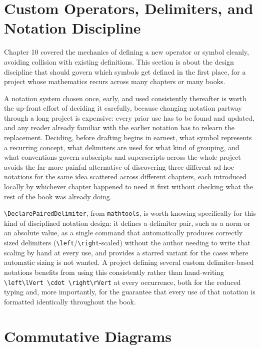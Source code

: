 \hypertarget{custom-operators-delimiters-and-notation-discipline}{%
\section{Custom Operators, Delimiters, and Notation Discipline}\label{custom-operators-delimiters-and-notation-discipline}}

Chapter 10 covered the mechanics of defining a new operator or symbol cleanly, avoiding collision with existing definitions. This section is about the design discipline that should govern which symbols get defined in the first place, for a project whose mathematics recurs across many chapters or many books.

A notation system chosen once, early, and used consistently thereafter is worth the up-front effort of deciding it carefully, because changing notation partway through a long project is expensive: every prior use has to be found and updated, and any reader already familiar with the earlier notation has to relearn the replacement. Deciding, before drafting begins in earnest, what symbol represents a recurring concept, what delimiters are used for what kind of grouping, and what conventions govern subscripts and superscripts across the whole project avoids the far more painful alternative of discovering three different ad hoc notations for the same idea scattered across different chapters, each introduced locally by whichever chapter happened to need it first without checking what the rest of the book was already doing.

\texttt{\textbackslash{}DeclarePairedDelimiter}, from \texttt{mathtools}, is worth knowing specifically for this kind of disciplined notation design: it defines a delimiter pair, such as a norm or an absolute value, as a single command that automatically produces correctly sized delimiters (\texttt{\textbackslash{}left}/\texttt{\textbackslash{}right}-scaled) without the author needing to write that scaling by hand at every use, and provides a starred variant for the cases where automatic sizing is not wanted. A project defining several custom delimiter-based notations benefits from using this consistently rather than hand-writing \texttt{\textbackslash{}left\textbackslash{}lVert\ \textbackslash{}cdot\ \textbackslash{}right\textbackslash{}rVert} at every occurrence, both for the reduced typing and, more importantly, for the guarantee that every use of that notation is formatted identically throughout the book.

\hypertarget{commutative-diagrams}{%
\section{Commutative Diagrams}\label{commutative-diagrams}}

